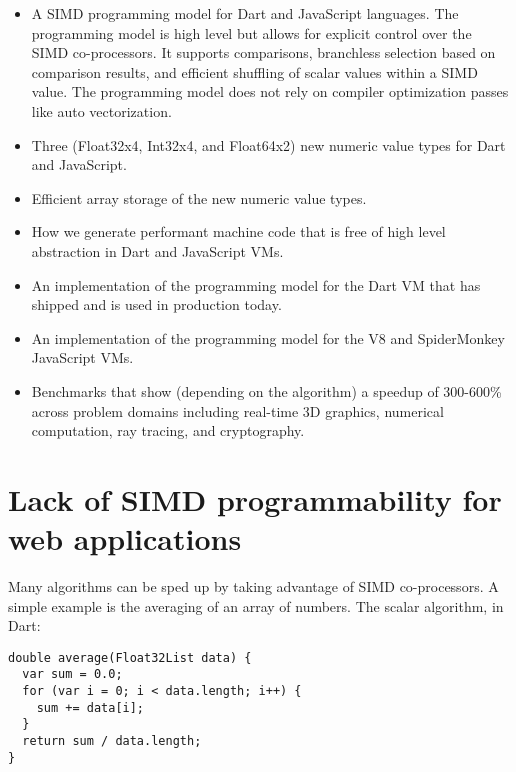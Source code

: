 \documentclass[preprint]{sigplanconf}
\begin{document}
\begin{itemize} 
\item
A SIMD programming model for Dart and JavaScript languages. The programming
model is high level but allows for explicit control over the SIMD co-processors.
It supports comparisons, branchless selection based on comparison results, and
efficient shuffling of scalar values within a SIMD value. The programming model
does not rely on compiler optimization passes like auto vectorization.

\item
Three (Float32x4, Int32x4, and Float64x2) new numeric value types for Dart and
JavaScript.

\item
Efficient array storage of the new numeric value types.

\item
How we generate performant machine code that is free of high level abstraction
in Dart and JavaScript VMs.

\item
An implementation of the programming model for the Dart VM that has shipped and
is used in production today.

\item
An implementation of the programming model for the V8 and SpiderMonkey
JavaScript VMs.

\item
Benchmarks that show (depending on the algorithm) a speedup of 300-600\% across
problem domains including real-time 3D graphics, numerical computation, ray
tracing, and cryptography.
\end{itemize}

\section{Lack of SIMD programmability for web applications}

Many algorithms can be sped up by taking advantage of SIMD co-processors. A
simple example is the averaging of an array of numbers. The scalar algorithm, in
Dart:

\begin{small}
\begin{lstlisting}
double average(Float32List data) {
  var sum = 0.0;
  for (var i = 0; i < data.length; i++) {
    sum += data[i]; 
  }
  return sum / data.length;
}
\end{lstlisting}
\end{small}
\end{document}
